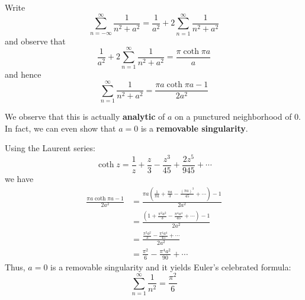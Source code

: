\documentclass[12pt]{article}
\begin{document}
Write $$\sum_{n=-\infty}^\infty\frac{1}{n^2+a^2}=\frac{1}{a^2}+2\sum_{n=1}^\infty\frac{1}{n^2+a^2}$$ and observe that $$\frac{1}{a^2}+2\sum_{n=1}^\infty\frac{1}{n^2+a^2}=\frac{\pi\coth\pi a}{a}$$ and hence $$\sum_{n=1}^\infty\frac{1}{n^2+a^2}=\frac{\pi a\coth\pi a-1}{2a^2}$$

We observe that this is actually \textbf{analytic}
of $a$ on a punctured neighborhood of 0. In fact, we can even show that $a=0$ is a \textbf{removable singularity}.

Using the Laurent series:
$$\coth z=\frac{1}{z}+\frac{z}{3}-\frac{z^{3}}{45}+\frac{2z^{5}}{945}+\cdots$$
we have
\begin{align*}
    \frac{\pi a\coth\pi a-1}{2a^{2}}&=\frac{\pi a\left(\frac{1}{\pi a}+\frac{\pi a}{3}-\frac{(\pi a)^{3}}{45}+\cdots\right)-1}{2a^{2}}\\
    &=\frac{\left(1+\frac{\pi^{2}a^{2}}{3}-\frac{\pi^{4}a^{4}}{45}+\cdots\right)-1}{2a^{2}}\\
&=\frac{\frac{\pi^{2}a^{2}}{3}-\frac{\pi^{4}a^{4}}{45}+\cdots}{2a^{2}}\\
&=\frac{\pi^{2}}{6}-\frac{\pi^{4}a^{2}}{90}+\cdots
\end{align*}
Thus, $a=0$ is a removable singularity and it yields Euler's celebrated formula:
\[\sum_{n=1}^{\infty}\frac{1}{n^2}= \frac{\pi^2}{6}\]
\end{document}
